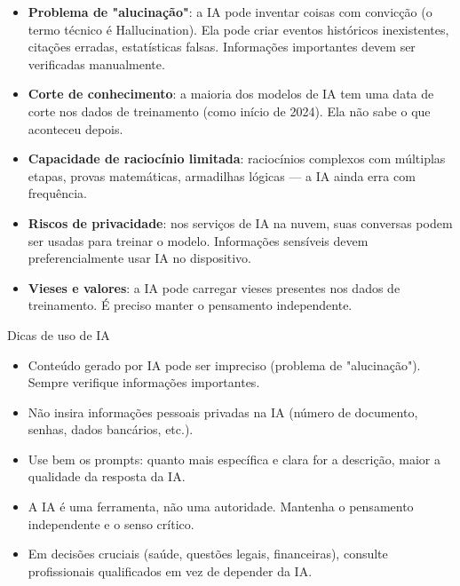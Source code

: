 \begin{itemize}
  \item \textbf{Problema de "alucinação"}: a IA pode inventar coisas com convicção (o termo técnico é Hallucination). Ela pode criar eventos históricos inexistentes, citações erradas, estatísticas falsas. Informações importantes devem ser verificadas manualmente.
  \item \textbf{Corte de conhecimento}: a maioria dos modelos de IA tem uma data de corte nos dados de treinamento (como início de 2024). Ela não sabe o que aconteceu depois.
  \item \textbf{Capacidade de raciocínio limitada}: raciocínios complexos com múltiplas etapas, provas matemáticas, armadilhas lógicas — a IA ainda erra com frequência.
  \item \textbf{Riscos de privacidade}: nos serviços de IA na nuvem, suas conversas podem ser usadas para treinar o modelo. Informações sensíveis devem preferencialmente usar IA no dispositivo.
  \item \textbf{Vieses e valores}: a IA pode carregar vieses presentes nos dados de treinamento. É preciso manter o pensamento independente.
\end{itemize}

\begin{tcbinfo}{Dicas de uso de IA}
\begin{itemize}
  \item Conteúdo gerado por IA pode ser impreciso (problema de "alucinação"). Sempre verifique informações importantes.
  \item Não insira informações pessoais privadas na IA (número de documento, senhas, dados bancários, etc.).
  \item Use bem os prompts: quanto mais específica e clara for a descrição, maior a qualidade da resposta da IA.
  \item A IA é uma ferramenta, não uma autoridade. Mantenha o pensamento independente e o senso crítico.
  \item Em decisões cruciais (saúde, questões legais, financeiras), consulte profissionais qualificados em vez de depender da IA.
\end{itemize}

\end{tcbinfo}

